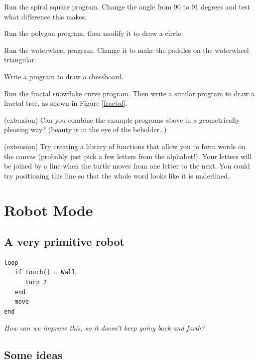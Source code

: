 \documentclass[12pt,a4paper,twoside]{article}
\renewcommand{\_}{\texttt{\symbol{95}}}
\begin{document}
\begin{numericlist}
\item Run the spiral square program.
	Change the angle from 90 to 91 degrees and test what difference
	this makes.
\item Run the polygon program, then modify it to draw a circle.
\item Run the waterwheel program. Change it to make the paddles on the
	waterwheel triangular.
\item Write a program to draw a chessboard.
\item Run the fractal snowflake curve program.
	Then write a similar program to draw a fractal tree, as shown in
	Figure \ref{fractal}.
%
      \item (extension) Can you combine the example programs above in
        a geometrically pleasing way? (beauty is in the eye of the
        beholder\dots)
%
      \item (extension) Try creating a library of functions that allow
        you to form words on the canvas (probably just pick a few
        letters from the alphabet!). Your letters will be joined by a
        line when the turtle moves from one letter to the next. You
        could try positioning this line so that the whole word looks
        like it is underlined.
%
\end{numericlist}


\section{Robot Mode}\label{sec:robot-mode}

\subsection{A very primitive robot}

\begin{verbatim}
loop
   if touch() = Wall
      turn 2
   end
   move
end
\end{verbatim}

\textit{How can we improve this, so it doesn't keep going back and forth?}

\subsection{Some ideas}
\end{document}
